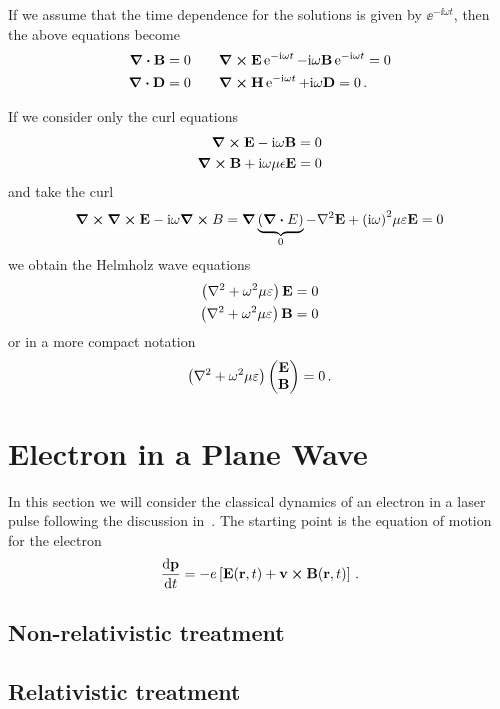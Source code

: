\documentclass[12pt, class=report, crop=false]{standalone}
\begin{document}
If we assume that the time dependence for the solutions is given by
\(\ee^{-\ii \omega t}\), then the above equations become
\begin{subequations}
  \begin{align*}
    \div{\vb{B}} &= 0  \qquad \curl{\vb{E}}\operatorname{e}^{-\mathrm{i} \omega t} - \mathrm{i} \omega \vb{B} \operatorname{e}^{-\mathrm{i} \omega t} = 0 \\
    \div{\vb{D}} &= 0  \qquad \curl{\vb{H}}\operatorname{e}^{-\mathrm{i} \omega t} + \mathrm{i} \omega \vb{D} = 0\,.
  \end{align*}
\end{subequations}

If we consider only the curl equations
\[
\begin{aligned}
  \curl{\vb{E}} - \mathrm{i} \omega \vb{B} = 0 \\
  \curl{\vb{B}} + \mathrm{i} \omega \mu \epsilon \vb{E} = 0
\end{aligned}
\]
and take the curl
\[
\curl{\curl{\vb{E}}} - \ii \omega \curl{B} = \grad{\underbrace{(\div{E})}_{0}}
- \laplacian{\vb{E}} + {(\ii \omega)}^2 \mu \varepsilon \vb{E} = 0
\]
we obtain the Helmholz wave equations
\[
\begin{aligned}
  \left(\laplacian + \omega^2 \mu \varepsilon \right)\vb{E} &= 0 \\
  \left(\laplacian + \omega^2 \mu \varepsilon \right)\vb{B} &= 0
\end{aligned}
\]
or in a more compact notation
\[
\left(\laplacian + \omega^2 \mu \varepsilon \right)
\begin{pmatrix}
  \vb{E} \\ \vb{B}
\end{pmatrix}
= 0\,.
\]


\section{Electron in a Plane Wave}

In this section we will consider the classical dynamics of an electron in a
laser pulse following the discussion in~\textcite{karsch_applicationshigh_2018}.
The starting point is the equation of motion for the electron
\begin{equation}
  \label{eq:lorentz-eom}
  \dv{\vb{p}}{t} = -e \left[ \vb{E}(\vb{r}, t) + \vb{v} \cp \vb{B}(\vb{r}, t) \right]\,.
\end{equation}

\subsection{Non-relativistic treatment}

\subsection{Relativistic treatment}
\end{document}
